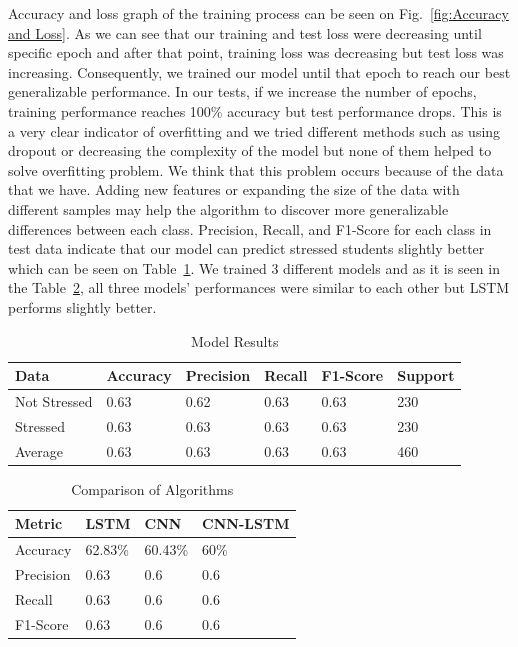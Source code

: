 \documentclass[12pt,oneandhalf,chaparabic,lfm,phd,eng,oneside,pntc]{gsufbe}
\begin{document}
Accuracy and loss graph of the training process can be seen on Fig.~\ref{fig:Accuracy and Loss}. As we can see that our training and test loss were decreasing until specific epoch and after that point, training loss was decreasing but test loss was increasing. Consequently, we trained our model until that epoch to reach our best generalizable performance. In our tests, if we increase the number of epochs, training performance reaches 100\% accuracy but test performance drops. This is a very clear indicator of overfitting and we tried different methods such as using dropout or decreasing the complexity of the model but none of them helped to solve overfitting problem. We think that this problem occurs because of the data that we have. Adding new features or expanding the size of the data with different samples may help the algorithm to discover more generalizable differences between each class. Precision, Recall, and F1-Score for each class in test data indicate that our model can predict stressed students slightly better which can be seen on Table~\ref{tab:Results}. We trained 3 different models and as it is seen in the Table~\ref{tab:Algorithm Comparison}, all three models' performances were similar to each other but LSTM performs slightly better.

\begin{table}[b!]
\centering
\caption{Model Results}
\label{tab:Results}
\begin{tabular}{|l|l|l|l|l|l|}
\hline
Data         & Accuracy & Precision & Recall & F1-Score & Support \\ \hline
Not Stressed & 0.63     & 0.62      & 0.63   & 0.63     & 230     \\
Stressed     & 0.63     & 0.63      & 0.63   & 0.63     & 230     \\
Average      & 0.63     & 0.63      & 0.63   & 0.63     & 460    
\\ \hline
\end{tabular}
\end{table}


\begin{table}[b!]
\centering
\caption{Comparison of Algorithms}
\label{tab:Algorithm Comparison}
\begin{tabular}{|l|l|l|l|}
\hline
Metric   & LSTM    & CNN     & CNN-LSTM \\ \hline
Accuracy & 62.83\% & 60.43\% & 60\% \\
Precision & 0.63 & 0.6 & 0.6 \\
Recall & 0.63 & 0.6 & 0.6 \\
F1-Score & 0.63 & 0.6 & 0.6 \\ 
\hline
\end{tabular}
\end{table}
\end{document}
